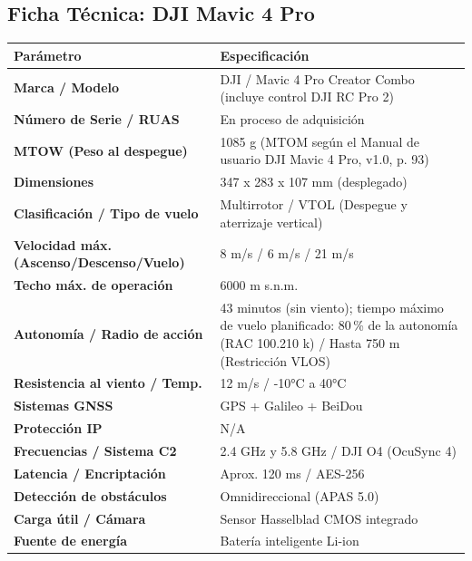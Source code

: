 \subsection{Ficha Técnica: DJI Mavic 4 Pro}
\begin{table}[H]
    \centering
    \renewcommand{\arraystretch}{1.2}
    \begin{tabular}{|p{5cm}|p{9cm}|}
        \hline
        \rowcolor[gray]{0.9} \textbf{Parámetro} & \textbf{Especificación} \\ \hline
        \textbf{Marca / Modelo} & DJI / Mavic 4 Pro Creator Combo (incluye control DJI RC Pro 2) \\ \hline
        \textbf{Número de Serie / RUAS} & En proceso de adquisición \\ \hline
        \textbf{MTOW (Peso al despegue)} & 1085 g (MTOM según el Manual de usuario DJI Mavic 4 Pro, v1.0, p. 93) \\ \hline
        \textbf{Dimensiones} & 347 x 283 x 107 mm (desplegado) \\ \hline
        \textbf{Clasificación / Tipo de vuelo} & Multirrotor / VTOL (Despegue y aterrizaje vertical) \\ \hline
        \textbf{Velocidad máx. (Ascenso/Descenso/Vuelo)} & 8 m/s / 6 m/s / 21 m/s \\ \hline
        \textbf{Techo máx. de operación} & 6000 m s.n.m. \\ \hline
        \textbf{Autonomía / Radio de acción} & 43 minutos (sin viento); tiempo máximo de vuelo planificado: 80\,\% de la autonomía (RAC 100.210 k) / Hasta 750 m (Restricción VLOS) \\ \hline
        \textbf{Resistencia al viento / Temp.} & 12 m/s / -10°C a 40°C \\ \hline
        \textbf{Sistemas GNSS} & GPS + Galileo + BeiDou \\ \hline
        \textbf{Protección IP} & N/A \\ \hline
        \textbf{Frecuencias / Sistema C2} & 2.4 GHz y 5.8 GHz / DJI O4 (OcuSync 4) \\ \hline
        \textbf{Latencia / Encriptación} & Aprox. 120 ms / AES-256 \\ \hline
        \textbf{Detección de obstáculos} & Omnidireccional (APAS 5.0) \\ \hline
        \textbf{Carga útil / Cámara} & Sensor Hasselblad CMOS integrado \\ \hline
        \textbf{Fuente de energía} & Batería inteligente Li-ion \\ \hline
    \end{tabular}
\end{table}

